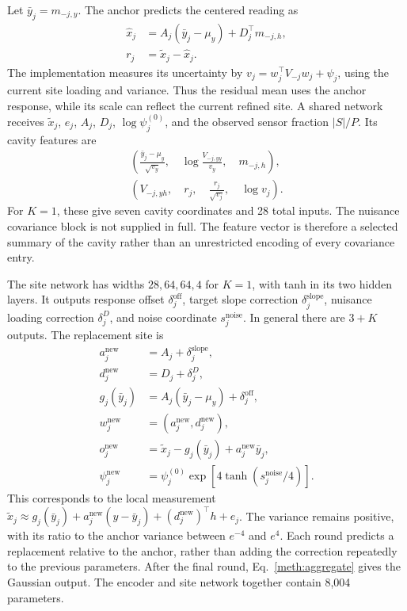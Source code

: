 Let $\bar y_j=m_{-j,y}$. The anchor predicts the centered reading as
\begin{equation}
  \begin{aligned}
  \widehat x_j&=A_j(\bar y_j-\mu_y)+D_j^\top m_{-j,h},\\
  r_j&=\widetilde x_j-\widehat x_j.
  \end{aligned}
  \label{meth:cavity-reading}
\end{equation}
The implementation measures its uncertainty by $v_j=w_j^\top V_{-j}w_j+\psi_j$, using the current site loading and variance. Thus the residual mean uses the anchor response, while its scale can reflect the current refined site. A shared network receives $\widetilde x_j$, $e_j$, $A_j$, $D_j$, $\log\psi_j^{(0)}$, and the observed sensor fraction $|S|/P$. Its cavity features are
\begin{equation}
  \begin{gathered}
  \left(\frac{\bar y_j-\mu_y}{\sqrt{v_y}},\quad
  \log\frac{V_{-j,yy}}{v_y},\quad m_{-j,h}\right),\\
  \left(V_{-j,yh},\quad r_j,\quad
  \frac{r_j}{\sqrt{v_j}},\quad\log v_j\right).
  \end{gathered}
  \label{meth:cavity-features}
\end{equation}
For $K=1$, these give seven cavity coordinates and 28 total inputs. The nuisance covariance block is not supplied in full. The feature vector is therefore a selected summary of the cavity rather than an unrestricted encoding of every covariance entry.

The site network has widths $28,64,64,4$ for $K=1$, with tanh in its two hidden layers. It outputs response offset $\delta_j^{\mathrm{off}}$, target slope correction $\delta_j^{\mathrm{slope}}$, nuisance loading correction $\delta_j^D$, and noise coordinate $s_j^{\mathrm{noise}}$. In general there are $3+K$ outputs. The replacement site is
\begin{align}
  a_j^{\mathrm{new}}&=A_j+\delta_j^{\mathrm{slope}},\nonumber\\
  d_j^{\mathrm{new}}&=D_j+\delta_j^D,\nonumber\\
  g_j(\bar y_j)&=A_j(\bar y_j-\mu_y)+\delta_j^{\mathrm{off}},\nonumber\\
  w_j^{\mathrm{new}}&=(a_j^{\mathrm{new}},d_j^{\mathrm{new}}),\nonumber\\
  o_j^{\mathrm{new}}&=\widetilde x_j-g_j(\bar y_j)
                        +a_j^{\mathrm{new}}\bar y_j,\nonumber\\
  \psi_j^{\mathrm{new}}&=\psi_j^{(0)}
    \exp\!\left[4\tanh\!\left(s_j^{\mathrm{noise}}/4\right)\right].
  \label{meth:replacement}
\end{align}
This corresponds to the local measurement $\widetilde x_j\approx g_j(\bar y_j)+a_j^{\mathrm{new}}(y-\bar y_j)+(d_j^{\mathrm{new}})^\top h+e_j$. The variance remains positive, with its ratio to the anchor variance between $e^{-4}$ and $e^4$. Each round predicts a replacement relative to the anchor, rather than adding the correction repeatedly to the previous parameters. After the final round, Eq.~\eqref{meth:aggregate} gives the Gaussian output. The encoder and site network together contain 8,004 parameters.

